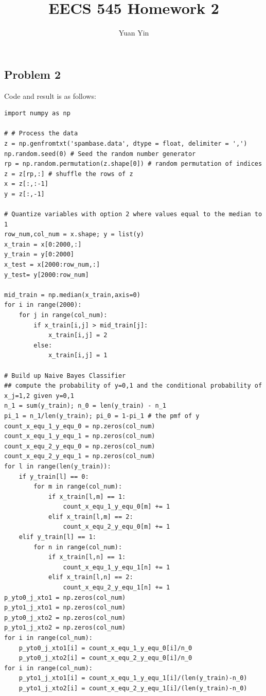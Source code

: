\documentclass[letterpaper,11pt]{article}
\author{Yuan Yin}
\title{EECS 545 Homework 2}
\begin{document}
\large
\maketitle
\begin{spacing}{1.2}  %
\section*{Problem 2}
Code and result is as follows:
\begin{lstlisting}
import numpy as np

# # Process the data
z = np.genfromtxt('spambase.data', dtype = float, delimiter = ',')
np.random.seed(0) # Seed the random number generator
rp = np.random.permutation(z.shape[0]) # random permutation of indices
z = z[rp,:] # shuffle the rows of z
x = z[:,:-1]
y = z[:,-1]

# Quantize variables with option 2 where values equal to the median to 1
row_num,col_num = x.shape; y = list(y)
x_train = x[0:2000,:]
y_train = y[0:2000]
x_test = x[2000:row_num,:]
y_test= y[2000:row_num]

mid_train = np.median(x_train,axis=0)
for i in range(2000):
    for j in range(col_num):
        if x_train[i,j] > mid_train[j]:
            x_train[i,j] = 2
        else:
            x_train[i,j] = 1

# Build up Naive Bayes Classifier
## compute the probability of y=0,1 and the conditional probability of x_j=1,2 given y=0,1
n_1 = sum(y_train); n_0 = len(y_train) - n_1
pi_1 = n_1/len(y_train); pi_0 = 1-pi_1 # the pmf of y
count_x_equ_1_y_equ_0 = np.zeros(col_num)
count_x_equ_1_y_equ_1 = np.zeros(col_num)
count_x_equ_2_y_equ_0 = np.zeros(col_num)
count_x_equ_2_y_equ_1 = np.zeros(col_num)
for l in range(len(y_train)):
    if y_train[l] == 0:
        for m in range(col_num):
            if x_train[l,m] == 1:
                count_x_equ_1_y_equ_0[m] += 1
            elif x_train[l,m] == 2:
                count_x_equ_2_y_equ_0[m] += 1
    elif y_train[l] == 1:
        for n in range(col_num):
            if x_train[l,n] == 1:
                count_x_equ_1_y_equ_1[n] += 1
            elif x_train[l,n] == 2:
                count_x_equ_2_y_equ_1[n] += 1
p_yto0_j_xto1 = np.zeros(col_num)
p_yto1_j_xto1 = np.zeros(col_num)
p_yto0_j_xto2 = np.zeros(col_num)
p_yto1_j_xto2 = np.zeros(col_num)
for i in range(col_num):
    p_yto0_j_xto1[i] = count_x_equ_1_y_equ_0[i]/n_0
    p_yto0_j_xto2[i] = count_x_equ_2_y_equ_0[i]/n_0
for i in range(col_num):
    p_yto1_j_xto1[i] = count_x_equ_1_y_equ_1[i]/(len(y_train)-n_0)
    p_yto1_j_xto2[i] = count_x_equ_2_y_equ_1[i]/(len(y_train)-n_0)


\end{lstlisting}
\end{spacing}
\end{document}
